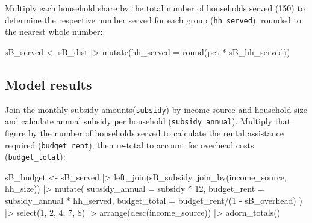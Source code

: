 \documentclass[
  10pt,
  letterpaper,
  DIV=11,
  numbers=noendperiod]{scrartcl}
\newenvironment{Shaded}{\begin{snugshade}}{\end{snugshade}}
\newcommand{\AttributeTok}[1]{\textcolor[rgb]{0.40,0.45,0.13}{#1}}
\newcommand{\DecValTok}[1]{\textcolor[rgb]{0.68,0.00,0.00}{#1}}
\newcommand{\FunctionTok}[1]{\textcolor[rgb]{0.28,0.35,0.67}{#1}}
\newcommand{\NormalTok}[1]{\textcolor[rgb]{0.00,0.23,0.31}{#1}}
\newcommand{\OtherTok}[1]{\textcolor[rgb]{0.00,0.23,0.31}{#1}}
\newcommand{\SpecialCharTok}[1]{\textcolor[rgb]{0.37,0.37,0.37}{#1}}
\begin{document}
\hfill\break
\hfill\break
Multiply each household share by the total number of households served
(150) to determine the respective number served for each group
(\texttt{hh\_served}), rounded to the nearest whole number:

\begin{Shaded}
\begin{Highlighting}[]
\NormalTok{sB\_served }\OtherTok{\textless{}{-}}\NormalTok{ sB\_dist }\SpecialCharTok{|\textgreater{}} 
  \FunctionTok{mutate}\NormalTok{(}\AttributeTok{hh\_served =} \FunctionTok{round}\NormalTok{(pct }\SpecialCharTok{*}\NormalTok{ sB\_hh\_served)) }
\end{Highlighting}
\end{Shaded}

\newpage

\subsection{Model results}\label{model-results-1}

Join the monthly subsidy amounts(\texttt{subsidy}) by income source and
household size and calculate annual subsidy per household
(\texttt{subsidy\_annual}). Multiply that figure by the number of
households served to calculate the rental assistance required
(\texttt{budget\_rent}), then re-total to account for overhead costs
(\texttt{budget\_total}):

\begin{Shaded}
\begin{Highlighting}[]
\NormalTok{sB\_budget }\OtherTok{\textless{}{-}}\NormalTok{ sB\_served }\SpecialCharTok{|\textgreater{}} 
  \FunctionTok{left\_join}\NormalTok{(sB\_subsidy, }\FunctionTok{join\_by}\NormalTok{(income\_source, hh\_size)) }\SpecialCharTok{|\textgreater{}} 
  \FunctionTok{mutate}\NormalTok{(}
    \AttributeTok{subsidy\_annual =}\NormalTok{ subsidy }\SpecialCharTok{*} \DecValTok{12}\NormalTok{,}
    \AttributeTok{budget\_rent =}\NormalTok{ subsidy\_annual }\SpecialCharTok{*}\NormalTok{ hh\_served,}
    \AttributeTok{budget\_total =}\NormalTok{ budget\_rent}\SpecialCharTok{/}\NormalTok{(}\DecValTok{1} \SpecialCharTok{{-}}\NormalTok{ sB\_overhead)}
\NormalTok{    ) }\SpecialCharTok{|\textgreater{}} 
  \FunctionTok{select}\NormalTok{(}\DecValTok{1}\NormalTok{, }\DecValTok{2}\NormalTok{, }\DecValTok{4}\NormalTok{, }\DecValTok{7}\NormalTok{, }\DecValTok{8}\NormalTok{) }\SpecialCharTok{|\textgreater{}} 
  \FunctionTok{arrange}\NormalTok{(}\FunctionTok{desc}\NormalTok{(income\_source)) }\SpecialCharTok{|\textgreater{}} 
  \FunctionTok{adorn\_totals}\NormalTok{()}
\end{Highlighting}
\end{Shaded}
\end{document}
